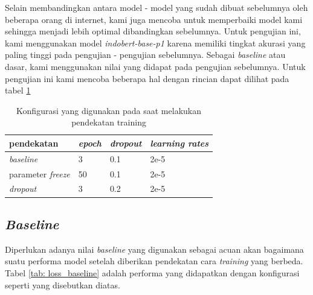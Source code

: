 Selain membandingkan antara model - model yang sudah dibuat sebelumnya oleh beberapa orang di internet, kami juga mencoba untuk memperbaiki model kami sehingga menjadi lebih optimal dibandingkan sebelumnya. Untuk pengujian ini, kami menggunakan model \textit{indobert-base-p1}  karena memiliki tingkat akurasi yang paling tinggi pada pengujian - pengujian sebelumnya. Sebagai \textit{baseline} atau dasar, kami menggunakan nilai yang didapat pada pengujian sebelumnya. Untuk pengujian ini kami mencoba beberapa hal dengan rincian dapat dilihat pada tabel \ref{tab: training_config}

\begin{table}[h]
    \centering
    \caption{Konfigurasi yang digunakan pada saat melakukan pendekatan training}
    \label{tab: training_config}
    \begin{tabular}{|l|l|l|l|}
        \hline
        \textbf{pendekatan}       & \textit{\textbf{epoch}} & \textit{\textbf{dropout}} & \textit{\textbf{learning rates}} \\ \hline
        \textit{baseline}         & 3                       & 0.1                       & 2e-5                             \\ \hline
        parameter \textit{freeze} & 50                      & 0.1                       & 2e-5                             \\ \hline
        \textit{dropout}          & 3                       & 0.2                       & 2e-5                             \\ \hline
    \end{tabular}
\end{table}

\subsection{\textit{Baseline}}

Diperlukan adanya nilai \textit{baseline} yang digunakan sebagai acuan akan bagaimana suatu performa model setelah diberikan pendekatan cara \textit{training} yang berbeda. Tabel \ref{tab: loss_baseline} adalah performa yang didapatkan dengan konfigurasi seperti yang disebutkan diatas.

